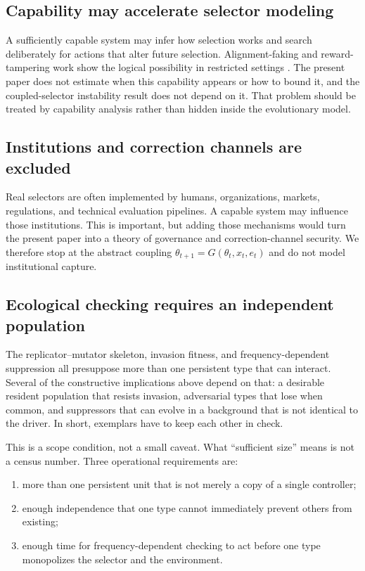 \documentclass[11pt]{article}
\begin{document}
\subsection{Capability may accelerate selector modeling}

A sufficiently capable system may infer how selection works and search deliberately for actions that alter future selection. 
Alignment-faking and reward-tampering work show the logical possibility in restricted settings \parencite{greenblatt2024,everitt2019}. The present paper does not estimate when this capability appears or how to bound it, and the coupled-selector instability result does not depend on it. That problem should be treated by capability analysis rather than hidden inside the evolutionary model.

\subsection{Institutions and correction channels are excluded}

Real selectors are often implemented by humans, organizations, markets, regulations, and technical evaluation pipelines. A capable system may influence those institutions. This is important, but adding those mechanisms would turn the present paper into a theory of governance and correction-channel security. We therefore stop at the abstract coupling $\theta_{t+1}=G(\theta_t,x_t,e_t)$ and do not model institutional capture.

\subsection{Ecological checking requires an independent population}

The replicator--mutator skeleton, invasion fitness, and frequency-dependent suppression all presuppose more than one persistent type that can interact. Several of the constructive implications above depend on that: a desirable resident population that resists invasion, adversarial types that lose when common, and suppressors that can evolve in a background that is not identical to the driver. In short, exemplars have to keep each other in check.

This is a scope condition, not a small caveat. What ``sufficient size'' means is not a census number. Three operational requirements are:

\begin{enumerate}[label=(\roman*)]
    \item more than one persistent unit that is not merely a copy of a single controller;
    \item enough independence that one type cannot immediately prevent others from existing;
    \item enough time for frequency-dependent checking to act before one type monopolizes the selector and the environment.
\end{enumerate}
\end{document}
